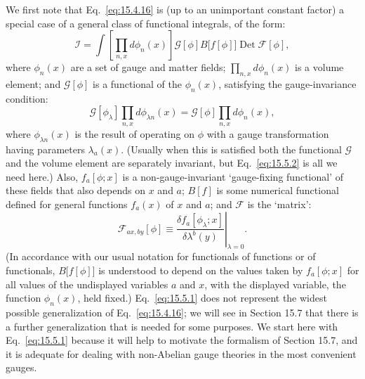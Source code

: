 We first note that Eq.~\eqref{eq:15.4.16} is (up to an unimportant constant
factor) a special case of a general class of functional integrals, of the form:
\begin{equation}
  \mathcal I=\int\left[\prod_{n,x}d\phi_n(x)\right]
  \mathcal G[\phi]B\bigl[f[\phi]\bigr]\operatorname{Det}\mathcal F[\phi],
  \tag{15.5.1}\label{eq:15.5.1}
\end{equation}
where $\phi_n(x)$ are a set of gauge and matter fields;
$\prod_{n,x}d\phi_n(x)$ is a volume element; and $\mathcal G[\phi]$ is a
functional of the $\phi_n(x)$, satisfying the gauge-invariance condition:
\begin{equation}
  \mathcal G[\phi_\lambda]\prod_{n,x}d\phi_{\lambda n}(x)
  =\mathcal G[\phi]\prod_{n,x}d\phi_n(x),
  \tag{15.5.2}\label{eq:15.5.2}
\end{equation}
where $\phi_{\lambda n}(x)$ is the result of operating on $\phi$ with a gauge
transformation having parameters $\lambda_a(x)$. (Usually when this is
satisfied both the functional $\mathcal G$ and the volume element are
separately invariant, but Eq.~\eqref{eq:15.5.2} is all we need here.) Also,
$f_a[\phi;x]$ is a non-gauge-invariant `gauge-fixing functional' of these
fields that also depends on $x$ and $a$; $B[f]$ is some numerical
functional defined for general functions $f_a(x)$ of $x$ and $a$;
and $\mathcal F$ is the `matrix':
\begin{equation}
  \mathcal F_{a x,b y}[\phi]
  \equiv\left.\frac{\delta f_a[\phi_\lambda;x]}
  {\delta\lambda^b(y)}\right|_{\lambda=0}.
  \tag{15.5.3}\label{eq:15.5.3}
\end{equation}
(In accordance with our usual notation for functionals of functions or of
functionals, $B\bigl[f[\phi]\bigr]$ is understood to depend on the values taken
by $f_a[\phi;x]$ for all values of the undisplayed variables $a$ and
$x$, with the displayed variable, the function $\phi_n(x)$, held fixed.)
Eq.~\eqref{eq:15.5.1} does not represent the widest possible generalization of
Eq.~\eqref{eq:15.4.16}; we will see in Section 15.7 that there is a further
generalization that is needed for some purposes. We start here with
Eq.~\eqref{eq:15.5.1} because it will help to motivate the formalism of
Section 15.7, and it is adequate for dealing with non-Abelian gauge theories
in the most convenient gauges.

